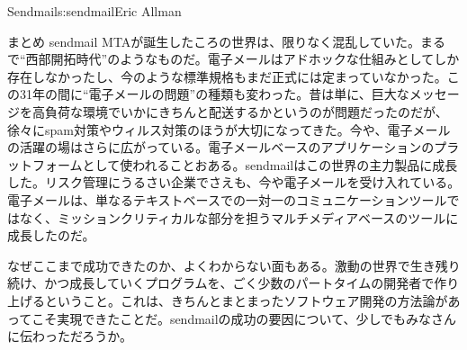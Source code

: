\begin{aosachapter}{Sendmail}{s:sendmail}{Eric Allman}
\begin{aosasect1}{まとめ}
sendmail MTAが誕生したころの世界は、限りなく混乱していた。まるで``西部開拓時代''のようなものだ。電子メールはアドホックな仕組みとしてしか存在しなかったし、今のような標準規格もまだ正式には定まっていなかった。この31年の間に``電子メールの問題''の種類も変わった。昔は単に、巨大なメッセージを高負荷な環境でいかにきちんと配送するかというのが問題だったのだが、徐々にspam対策やウィルス対策のほうが大切になってきた。今や、電子メールの活躍の場はさらに広がっている。電子メールベースのアプリケーションのプラットフォームとして使われることおある。sendmailはこの世界の主力製品に成長した。リスク管理にうるさい企業でさえも、今や電子メールを受け入れている。電子メールは、単なるテキストベースでの一対一のコミュニケーションツールではなく、ミッションクリティカルな部分を担うマルチメディアベースのツールに成長したのだ。

なぜここまで成功できたのか、よくわからない面もある。激動の世界で生き残り続け、かつ成長していくプログラムを、ごく少数のパートタイムの開発者で作り上げるということ。これは、きちんとまとまったソフトウェア開発の方法論があってこそ実現できたことだ。sendmailの成功の要因について、少しでもみなさんに伝わっただろうか。

\end{aosasect1}

\end{aosachapter}
